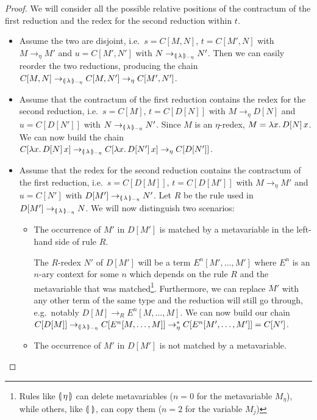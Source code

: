 \begin{proof}
  We will consider all the possible relative positions of the contractum of
  the first reduction and the redex for the second reduction within $t$.
  
  \begin{itemize}
  \item Assume the two are disjoint, i.e.\ $s = C[M,N]$, $t = C[M',N]$ with
    $M \to_\eta M'$ and $u = C[M',N']$ with $N \to_{\llparenthesis \, \lambda \, \rrparenthesis_{-\eta}} N'$. Then we
    can easily reorder the two reductions, producing the chain
    $C[M,N] \to_{\llparenthesis \, \lambda \, \rrparenthesis_{-\eta}} C[M,N'] \to_\eta C[M',N']$.
  \item Assume that the contractum of the first reduction contains the
    redex for the second reduction, i.e.\ $s = C[M]$, $t = C[D[N]]$ with
    $M \to_\eta D[N]$ and $u = C[D[N']]$ with $N \to_{\llparenthesis \, \lambda \, \rrparenthesis_{-\eta}} N'$. Since
    $M$ is an $\eta$-redex, $M = \lambda x.\, D[N]\,x$. We can now build
    the chain
    $C[\lambda x.\, D[N]\,x] \to_{\llparenthesis \, \lambda \, \rrparenthesis_{-\eta}} C[\lambda x.\, D[N']\,x]
    \to_\eta C[D[N']]$.
  \item Assume that the redex for the second reduction contains the
    contractum of the first reduction, i.e.\ $s = C[D[M]]$, $t = C[D[M']]$
    with $M \to_\eta M'$ and $u = C[N']$ with $D[M'] \to_{\llparenthesis \, \lambda \, \rrparenthesis_{-\eta}} N'$. Let
    $R$ be the rule used in $D[M'] \to_{\llparenthesis \, \lambda \, \rrparenthesis_{-\eta}} N$. We will now distinguish
    two scenarios:

    \begin{itemize}
    \item The occurrence of $M'$ in $D[M']$ is matched by a metavariable in
      the left-hand side of rule $R$.
      
      The $R$-redex $N'$ of $D[M']$ will be a term $E^n[M',\ldots,M']$
      where $E^n$ is an $n$-ary context for some $n$ which depends on the
      rule $R$ and the metavariable that was matched\footnote{Rules like
        $\llparenthesis \, \eta \, \rrparenthesis$ can delete metavariables ($n = 0$ for the
        metavariable $M_\eta$), while others, like $\llparenthesis \, \mathtt{\, \rrparenthesis}$, can copy
        them ($n = 2$ for the variable $M_j$)}. Furthermore, we can replace
      $M'$ with any other term of the same type and the reduction will
      still go through, e.g.\ notably $D[M] \to_R E^n[M,\ldots,M]$. We can
      now build our chain
      $C[D[M]] \to_{\llparenthesis \, \lambda \, \rrparenthesis_{-\eta}} C[E^n[M,\ldots,M]] \to^*_\eta
      C[E^n[M',\ldots,M']] = C[N']$.
      
    \item The occurrence of $M'$ in $D[M']$ is not matched by a
      metavariable.
      

\end{itemize}
\end{itemize}
\end{proof}
